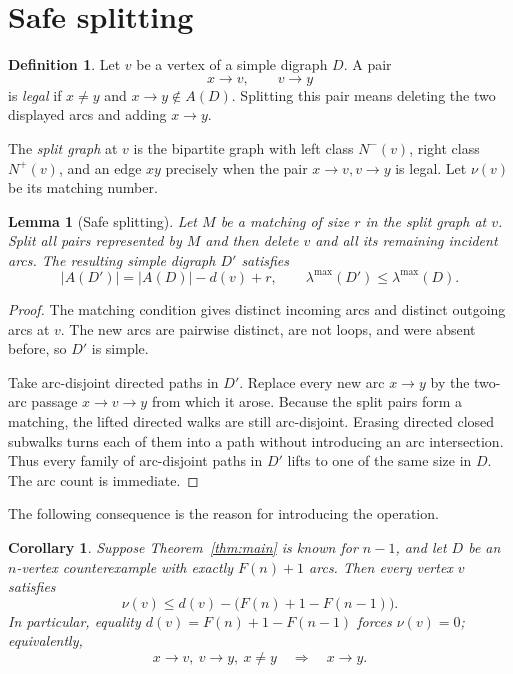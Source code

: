 \documentclass[11pt]{amsart}
\newtheorem{lemma}[theorem]{Lemma}
\newtheorem{corollary}[theorem]{Corollary}
\theoremstyle{definition}
\newtheorem{definition}[theorem]{Definition}
\newcommand{\lamax}{\lambda^{\max}}
\begin{document}
\section{Safe splitting}

\begin{definition}
Let $v$ be a vertex of a simple digraph $D$.  A pair
\[
 x\to v,\qquad v\to y
\]
is \emph{legal} if $x\ne y$ and $x\to y\notin A(D)$.  Splitting this pair
means deleting the two displayed arcs and adding $x\to y$.

The \emph{split graph} at $v$ is the bipartite graph with left class
$N^-(v)$, right class $N^+(v)$, and an edge $xy$ precisely when the pair
$x\to v, v\to y$ is legal.  Let $\nu(v)$ be its matching number.
\end{definition}

\begin{lemma}[Safe splitting]\label{lem:splitting}
Let $M$ be a matching of size $r$ in the split graph at $v$.  Split all
pairs represented by $M$ and then delete $v$ and all its remaining incident
arcs.  The resulting simple digraph $D'$ satisfies
\[
 |A(D')|=|A(D)|-d(v)+r,
 \qquad
 \lamax(D')\le \lamax(D).
\]
\end{lemma}

\begin{proof}
The matching condition gives distinct incoming arcs and distinct outgoing
arcs at $v$.  The new arcs are pairwise distinct, are not loops, and were
absent before, so $D'$ is simple.

Take arc-disjoint directed paths in $D'$.  Replace every new arc $x\to y$
by the two-arc passage $x\to v\to y$ from which it arose.  Because the
split pairs form a matching, the lifted directed walks are still
arc-disjoint.  Erasing directed closed subwalks turns each of them into a
path without introducing an arc intersection.  Thus every family of
arc-disjoint paths in $D'$ lifts to one of the same size in $D$.
The arc count is immediate.
\end{proof}

The following consequence is the reason for introducing the operation.

\begin{corollary}\label{cor:split-bound}
Suppose Theorem~\ref{thm:main} is known for $n-1$, and let $D$ be an
$n$-vertex counterexample with exactly $F(n)+1$ arcs.  Then every vertex
$v$ satisfies
\[
 \nu(v)\le d(v)-\bigl(F(n)+1-F(n-1)\bigr).
\]
In particular, equality
$d(v)=F(n)+1-F(n-1)$ forces $\nu(v)=0$; equivalently,
\[
 x\to v,\ v\to y,\ x\ne y
 \quad\Longrightarrow\quad x\to y.
 \tag{\(*\)}\label{eq:transitive-vertex}
\]
\end{corollary}
\end{document}
